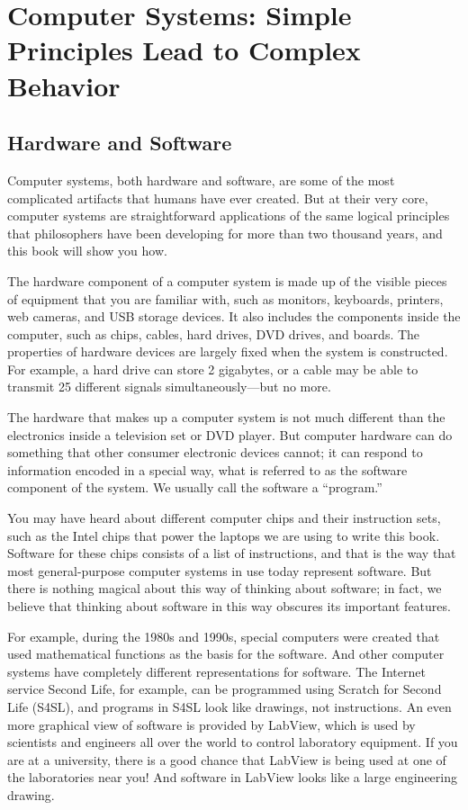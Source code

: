 \chapter[Computer Systems: Simple Principles Lead to Complex Behavior][Computer Systems]{Computer Systems: Simple Principles Lead to Complex Behavior}

\section{Hardware and Software}

Computer systems, both hardware and software, are some of the
most complicated artifacts that humans have ever created. But at
their very core, computer systems are straightforward
applications of the same logical principles that philosophers
have been developing for more than two thousand years, and
this book will show you how.

The hardware component of a computer system is made up of the visible
pieces of equipment that you are familiar with, such as monitors,
keyboards, printers, web cameras, and USB storage devices.  It also
includes the
components inside the computer, such as chips, cables, hard
drives, DVD drives, and boards.
The properties of hardware devices are largely fixed when the system is
constructed. For example, a hard drive can store 2 gigabytes,
or a cable may be able to transmit 25 different signals
simultaneously---but no more.

The hardware that makes up a computer system is not much different
than the electronics inside a television set or DVD
player. But computer hardware can do something that other
consumer electronic devices cannot; it can respond to
information encoded in a special way, what is
referred to as the software component of the system.  We usually
call the software a ``program.''

You may have heard
about different computer chips and their instruction sets, such
as the Intel chips that power the laptops we are using to
write this book.  Software for these chips consists of a list of
instructions, and that is the way that most general-purpose computer
systems in use today represent software.
But there is nothing magical about this way of thinking about
software; in fact, we believe that thinking about software in this
way obscures its important features.

For example, during the 1980s
and 1990s, special computers were created that used mathematical
functions as the basis for the software.  And other computer
systems have completely different representations for software.
The Internet service Second Life, for example, can be programmed
using Scratch for Second Life (S4SL), and programs in S4SL look
like drawings, not instructions.  An even more graphical view of
software is provided by LabView, which is used by scientists and
engineers all over the world to control laboratory equipment.
If you are at a university, there is a good chance
that LabView is being used at one of the laboratories near you!
And software in LabView looks like a large engineering drawing.


